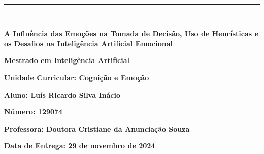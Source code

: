 \documentclass[a4paper,12pt]{report}
\begin{document}
	
\begin{titlepage}
	\centering
	\vspace*{-2cm} %
	
	\hfill%
	\\[0.5cm]
	
	\noindent
	{\color{barraazul}\rule{\textwidth}{1mm}} %
	\\[1cm]
	
	{\LARGE  \textbf{A Influência das Emoções na Tomada de Decisão, Uso de Heurísticas e os Desafios na Inteligência Artificial Emocional} \par}
	\vspace{3cm}
	
	{\Large \textbf{Mestrado em Inteligência Artificial}} \par
	{\large \textbf{Unidade Curricular: Cognição e Emoção}} \par
	\vspace{3cm}
	
	{\large \textbf{Aluno: Luís Ricardo Silva Inácio}} \par
	{\large \textbf{Número: 129074}} \par
	\vspace{3cm}
	

	
	{\large \textbf{Professora: Doutora Cristiane da Anunciação Souza}} \par
	\vfill
	
	\vspace{0.5cm}
	{\large \textbf{Data de Entrega: 29 de novembro de 2024}} \par
\end{titlepage}
\end{document}
